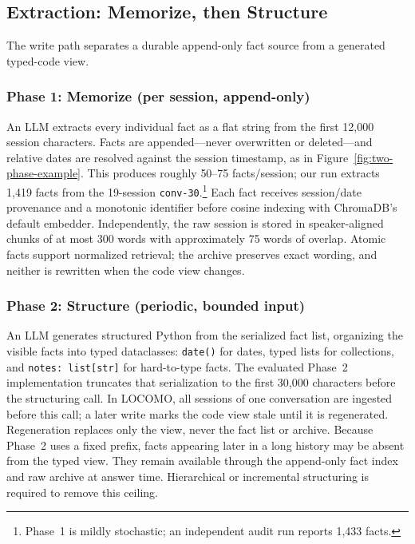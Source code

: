\documentclass[letterpaper]{article} %
\begin{document}
\subsection{Extraction: Memorize, then Structure}
\label{sec:extraction}

The write path separates a durable append-only fact source from a generated typed-code view.

\subsubsection{Phase 1: Memorize (per session, append-only)}

An LLM extracts every individual fact as a flat string from the first 12{,}000 session characters. Facts are appended---never overwritten or deleted---and relative dates are resolved against the session timestamp, as in Figure~\ref{fig:two-phase-example}. This produces roughly 50--75 facts/session; our run extracts 1{,}419 facts from the 19-session \texttt{conv-30}.\footnote{Phase~1 is mildly stochastic; an independent audit run reports 1{,}433 facts.} Each fact receives session/date provenance and a monotonic identifier before cosine indexing with ChromaDB's default embedder. Independently, the raw session is stored in speaker-aligned chunks of at most 300 words with approximately 75 words of overlap. Atomic facts support normalized retrieval; the archive preserves exact wording, and neither is rewritten when the code view changes.

\subsubsection{Phase 2: Structure (periodic, bounded input)}

An LLM generates structured Python from the serialized fact list, organizing the visible facts into typed dataclasses: \texttt{date()} for dates, typed lists for collections, and \texttt{notes: list[str]} for hard-to-type facts. The evaluated Phase~2 implementation truncates that serialization to the first 30{,}000 characters before the structuring call. In LOCOMO, all sessions of one conversation are ingested before this call; a later write marks the code view stale until it is regenerated. Regeneration replaces only the view, never the fact list or archive. Because Phase~2 uses a fixed prefix, facts appearing later in a long history may be absent from the typed view. They remain available through the append-only fact index and raw archive at answer time. Hierarchical or incremental structuring is required to remove this ceiling.
\end{document}
